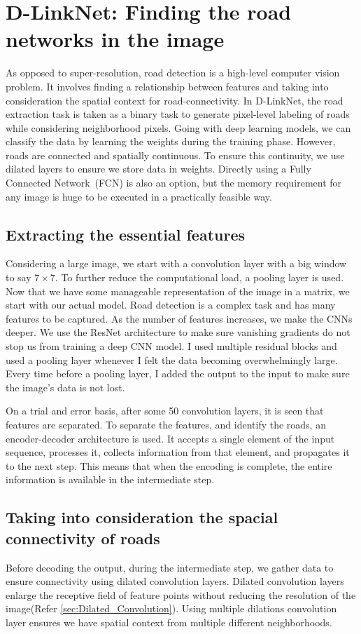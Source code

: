 \section{D-LinkNet: Finding the road networks in the image}
As opposed to super-resolution, road detection is a high-level computer vision problem. It involves finding a relationship between features and taking into consideration the spatial context for road-connectivity. In D-LinkNet, the road extraction task is taken as a binary task to generate pixel-level labeling of roads while considering neighborhood pixels. Going with deep learning models, we can classify the data by learning the weights during the training phase. However, roads are connected and spatially continuous. To ensure this continuity, we use dilated layers to ensure we store data in weights. Directly using a Fully Connected Network~(FCN) is also an option, but the memory requirement for any image is huge to be executed in a practically feasible way.

\subsection{Extracting the essential features}
Considering a large image, we start with a convolution layer with a big window to say $7\times7$. To further reduce the computational load, a pooling layer is used. Now that we have some manageable representation of the image in a matrix, we start with our actual model. Road detection is a complex task and has many features to be captured. As the number of features increases, we make the CNNs deeper. We use the ResNet architecture to make sure vanishing gradients do not stop us from training a deep CNN model. I used multiple residual blocks and used a pooling layer whenever I felt the data becoming overwhelmingly large. Every time before a pooling layer, I added the output to the input to make sure the image's data is not lost.

On a trial and error basis, after some 50 convolution layers, it is seen that features are separated. To separate the features, and identify the roads, an encoder-decoder architecture is used. It accepts a single element of the input sequence, processes it, collects information from that element, and propagates it to the next step. This means that when the encoding is complete, the entire information is available in the intermediate step.

\subsection{Taking into consideration the spacial connectivity of roads}
Before decoding the output, during the intermediate step, we gather data to ensure connectivity using dilated convolution layers. Dilated convolution layers enlarge the receptive field of feature points without reducing the resolution of the image(Refer \cref{sec:Dilated_Convolution}). Using multiple dilations convolution layer ensures we have spatial context from multiple different neighborhoods.


